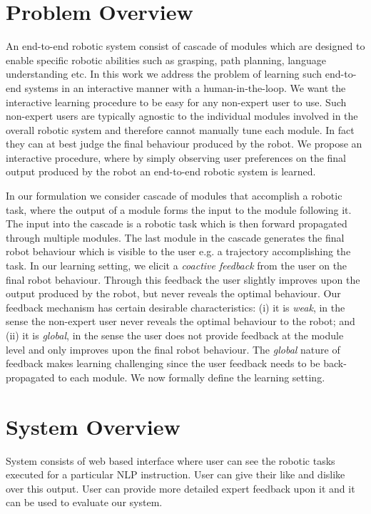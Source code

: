 \section{Problem Overview}

An end-to-end robotic system consist of cascade of modules which are designed to enable specific robotic abilities such as grasping, path planning, language understanding etc. In this
work we address the problem of learning such end-to-end systems in an interactive manner with a human-in-the-loop. We want the interactive learning procedure to be easy for any non-expert user to use. Such non-expert users are typically agnostic to the individual modules involved in the overall robotic system and therefore cannot manually tune each module. In fact they can at best judge the final behaviour produced by the robot. We propose an interactive procedure, where by simply observing user preferences on the final output produced by the robot an end-to-end robotic system is learned.

In our formulation we consider cascade of modules that accomplish a robotic task, where the output of a module forms the input to the module following it. The input into the cascade is a robotic task which is then forward propagated through multiple modules. The last module in the cascade generates the final robot behaviour which is visible to the user e.g. a trajectory accomplishing the task. In our learning setting, we elicit a \textit{coactive feedback} from the user on the final robot behaviour. Through this feedback the user slightly improves upon the output produced by the robot, but never reveals the optimal behaviour. Our feedback mechanism has certain desirable characteristics: (i) it is \textit{weak}, in the sense the non-expert user never reveals the optimal behaviour to the robot; and (ii) it is \textit{global}, in the sense the user does not provide feedback at the module level and only improves upon the final robot behaviour. The \textit{global} nature of feedback makes learning challenging since the user feedback needs to be back-propagated to each module. We now formally define the learning setting.

\section{System Overview}



System consists of web based interface where user can see the robotic tasks
executed for a particular NLP instruction. User can give their like and dislike
over this output. User can provide more detailed expert feedback upon it and it
can be used to evaluate our system. 


